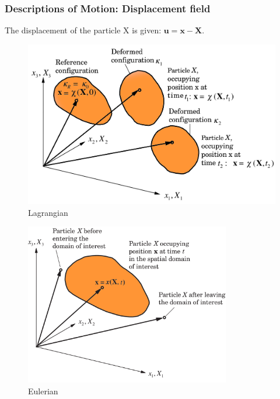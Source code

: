 \documentclass[notes]{beamer}
\begin{document}
\begin{frame}
	\frametitle{Descriptions of Motion: Displacement field}
	The displacement of the particle X is given: $\mathbf{u = x -X}$.
	\noindent
	\fboxsep=0pt
	\noindent
	\begin{minipage}[t]{0.49\linewidth}
		\centering
		\begin{figure}
			\includegraphics[width=\textwidth]{figs/lagrangian.png}
			\caption*{Lagrangian}
		\end{figure}
	\end{minipage}%
	\hfill%
	\begin{minipage}[t]{0.49\linewidth}
		\centering
		\begin{figure}
			\includegraphics[width=0.8\textwidth]{figs/eulerian.png}
			\caption*{Eulerian}
		\end{figure}
	\end{minipage}	
\end{frame}
\end{document}
